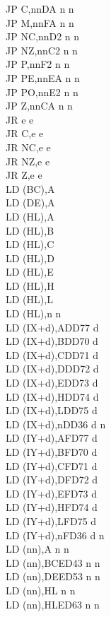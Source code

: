 \documentclass[twoside,openright,a4paper]{book}
\begin{document}
\begin{multicols}{3}
{\begin{tabbing}
	JP C,nn\>DA n n\\
	JP M,nn\>FA n n\\
	JP NC,nn\>D2 n n\\
	JP NZ,nn\>C2 n n\\
	JP P,nn\>F2 n n\\
	JP PE,nn\>EA n n\\
	JP PO,nn\>E2 n n\\
	JP Z,nn\>CA n n\\
	JR e e\\
	JR C,e e\\
	JR NC,e e\\
	JR NZ,e e\\
	JR Z,e e\\
	LD (BC),A\\
	LD (DE),A\\
	LD (HL),A\\
	LD (HL),B\\
	LD (HL),C\\
	LD (HL),D\\
	LD (HL),E\\
	LD (HL),H\\
	LD (HL),L\\
	LD (HL),n n\\
	LD (IX+d),A\>DD77 d\\
	LD (IX+d),B\>DD70 d\\
	LD (IX+d),C\>DD71 d\\
	LD (IX+d),D\>DD72 d\\
	LD (IX+d),E\>DD73 d\\
	LD (IX+d),H\>DD74 d\\
	LD (IX+d),L\>DD75 d\\
	LD (IX+d),n\>DD36 d n\\
	LD (IY+d),A\>FD77 d\\
	LD (IY+d),B\>FD70 d\\
	LD (IY+d),C\>FD71 d\\
	LD (IY+d),D\>FD72 d\\
	LD (IY+d),E\>FD73 d\\
	LD (IY+d),H\>FD74 d\\
	LD (IY+d),L\>FD75 d\\
	LD (IY+d),n\>FD36 d n\\
	LD (nn),A n n\\
	LD (nn),BC\>ED43 n n\\
	LD (nn),DE\>ED53 n n\\
	LD (nn),HL n n\\
	LD (nn),HL\>ED63 n n\\

\end{tabbing}}
\end{multicols}
\end{document}
